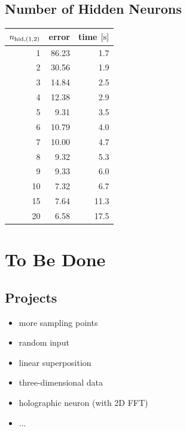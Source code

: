 \documentclass{beamer}
\begin{document}
\subsection{Number of Hidden Neurons}
\begin{frame}
\begin{table}
\begin{tabular}{|r|r|r|}\hline
$n_{{\rm hid,(1,2)}}$&error&time $[{\rm s}]$\\
\hline\hline
 1&86.23& 1.7\\
 2&30.56& 1.9\\
 3&14.84& 2.5\\
 4&12.38& 2.9\\
 5& 9.31& 3.5\\
 6&10.79& 4.0\\
 7&10.00& 4.7\\
 8& 9.32& 5.3\\
 9& 9.33& 6.0\\
10& 7.32& 6.7\\
\hline
15& 7.64&11.3\\
\hline
20& 6.58&17.5\\
\hline
\end{tabular}
\end{table}

\end{frame}

\section{To Be Done}
\subsection{Projects}
\begin{frame}
\begin{itemize}
  \item more sampling points
  \item random input
  \item linear superposition
  \item three-dimensional data
  \item holographic neuron (with 2D FFT)
  \item ...
\end{itemize}

\end{frame}
\end{document}
